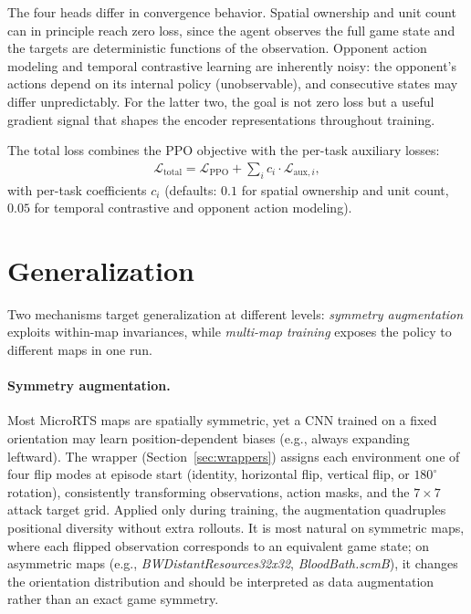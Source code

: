 \medskip

The four heads differ in convergence behavior. Spatial ownership and unit count can in principle reach zero loss, since the agent observes the full game state and the targets are deterministic functions of the observation. Opponent action modeling and temporal contrastive learning are inherently noisy: the opponent's actions depend on its internal policy (unobservable), and consecutive states may differ unpredictably. For the latter two, the goal is not zero loss but a useful gradient signal that shapes the encoder representations throughout training.

The total loss combines the PPO objective with the per-task auxiliary losses:
\begin{align}
\mathcal{L}_{\text{total}} = \mathcal{L}_{\text{PPO}} + \sum_i c_i \cdot \mathcal{L}_{\text{aux},i},
\end{align}
with per-task coefficients $c_i$ (defaults: $0.1$ for spatial ownership and unit count, $0.05$ for temporal contrastive and opponent action modeling).

\section{Generalization}
\label{sec:generalization}

Two mechanisms target generalization at different levels: \emph{symmetry augmentation} exploits within-map invariances, while \emph{multi-map training} exposes the policy to different maps in one run.

\paragraph{Symmetry augmentation.}

Most MicroRTS maps are spatially symmetric, yet a CNN trained on a fixed orientation may learn position-dependent biases (e.g., always expanding leftward). The  wrapper (Section~\ref{sec:wrappers}) assigns each environment one of four flip modes at episode start (identity, horizontal flip, vertical flip, or $180^\circ$ rotation), consistently transforming observations, action masks, and the $7{\times}7$ attack target grid. Applied only during training, the augmentation quadruples positional diversity without extra rollouts. It is most natural on symmetric maps, where each flipped observation corresponds to an equivalent game state; on asymmetric maps (e.g., \emph{BWDistantResources32x32}, \emph{BloodBath.scmB}), it changes the orientation distribution and should be interpreted as data augmentation rather than an exact game symmetry.

